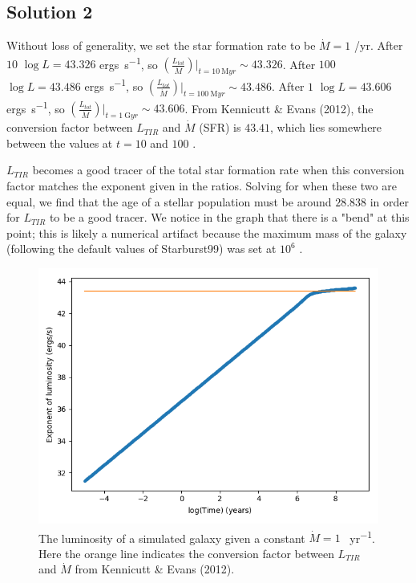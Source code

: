 \documentclass[11pt]{article}
\newenvironment{tight_enumerate}{
    \begin{enumerate}[label=(\alph*)]
    \setlength{\itemsep}{3pt}
    \setlength{\parskip}{0pt}}
    {\end{enumerate}}
\begin{document}
\subsection*{Solution 2}
\begin{tight_enumerate}
\item Without loss of generality, we set the star formation rate to be $\dot{M} = 1$ \si{\msun/yr}. After $10$ \si{} $\log{L} = 43.326$ \si{ergs\per\second}, so $\left(\frac{L_{tot}}{\dot{M}}\right)|_{t=10\ \si{\mega{yr}}} \sim 43.326$. After $100$ \si{} $\log{L} = 43.486$ \si{ergs\per\second}, so $\left(\frac{L_{tot}}{\dot{M}}\right)|_{t=100\ \si{\mega{yr}}} \sim 43.486$. After $1$ \si{} $\log{L} = 43.606$ \si{ergs\per\second}, so $\left(\frac{L_{tot}}{\dot{M}}\right)|_{t=1\ \si{\giga{yr}}} \sim 43.606$. From Kennicutt \& Evans (2012), the conversion factor between $L_{TIR}$ and $\dot{M}$ (SFR) is $43.41$, which lies somewhere between the values at $t = 10$ \si{} and $100$ \si{}. 

\item $L_{TIR}$ becomes a good tracer of the total star formation rate when this conversion factor matches the exponent given in the ratios. Solving for when these two are equal, we find that the age of a stellar population must be around $28.838$ \si{} in order for $L_{TIR}$ to be a good tracer. We notice in the graph that there is a "bend" at this point; this is likely a numerical artifact because the maximum mass of the galaxy (following the default values of Starburst99) was set at $10^{6}$ \si{\msun}.

\begin{figure}[h]
\centering
\includegraphics[height=0.45\textheight]{const_lum.png}
\vspace{-0.5em}
\caption{The luminosity of a simulated galaxy given a constant $\dot{M} = 1$ \si{\msun\per{yr}}. Here the orange line indicates the conversion factor between $L_{TIR}$ and $\dot{M}$ from Kennicutt \& Evans (2012).}
\end{figure}


\end{tight_enumerate}
\end{document}
